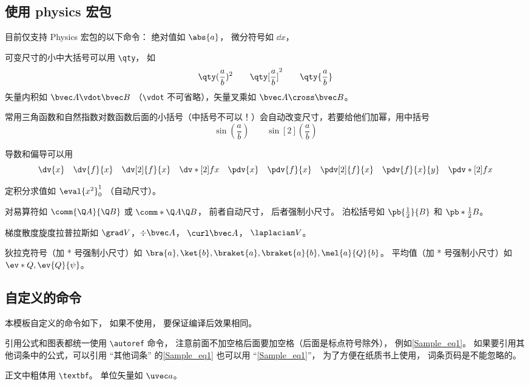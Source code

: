 \subsection{使用 physics 宏包}
目前仅支持 Physics 宏包的以下命令： 绝对值如 $\abs{a}$， 微分符号如 $\dd{x}$，

可变尺寸的小中大括号可以用 \lstinline|\qty|， 如
\begin{equation}
\qty(\frac ab)^2 \qquad \qty[\frac ab]^2 \qquad \qty{ \frac ab}
\end{equation}
矢量内积如 $\bvec A \vdot \bvec B$ （\lstinline|\vdot| 不可省略），矢量叉乘如 $\bvec A\cross\bvec B$。

常用三角函数和自然指数对数函数后面的小括号（中括号不可以！）会自动改变尺寸，若要给他们加幂，用中括号
\begin{equation}
\sin(\frac ab) \qquad \sin[2](\frac ab)
\end{equation}

导数和偏导可以用
\begin{equation}
\dv{x} \quad \dv{f}{x} \quad \dv[2]{f}{x} \quad \dv*[2]{f}{x} \quad
\pdv{x} \quad \pdv{f}{x} \quad \pdv[2]{f}{x} \quad \pdv{f}{x}{y} \quad \pdv*[2]{f}{x}
\end{equation}

定积分求值如 $\eval{x^2}_0^1$ （自动尺寸）。

对易算符如 $\comm{\Q A}{\Q B}$ 或 $\comm*{\Q A}{\Q B}$， 前者自动尺寸， 后者强制小尺寸。 泊松括号如 $\pb{\frac12}{B}$ 和 $\pb*{\frac12}{B}$。

梯度散度旋度拉普拉斯如 $\grad V$，$\div\bvec A$， $\curl\bvec A$， $\laplacian V$。

狄拉克符号（加 * 号强制小尺寸）如 $\bra{a}, \ket{b}, \braket{a}, \braket{a}{b}, \mel{a}{Q}{b}$。 平均值（加 * 号强制小尺寸）如 $\ev*{Q}, \ev{Q}{\psi}$。

\subsection{自定义的命令}
本模板自定义的命令如下， 如果不使用， 要保证编译后效果相同。

引用公式和图表都统一使用 \lstinline|\autoref| 命令， 注意前面不加空格后面要加空格（后面是标点符号除外）， 例如\autoref{Sample_eq1}。 如果要引用其他词条中的公式，可以引用 “其他词条” 的\autoref{Sample_eq1} 也可以用 “\autoref{Sample_eq1}”， 为了方便在纸质书上使用， 词条页码是不能忽略的。

正文中粗体用 \lstinline|\textbf|。 单位矢量如 $\uvec a$。

